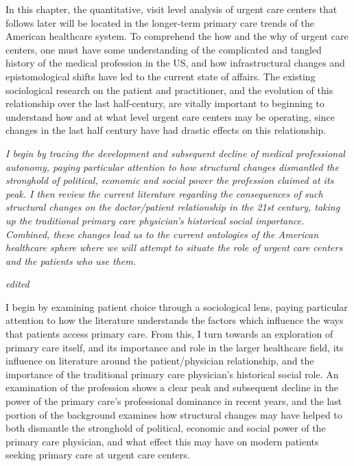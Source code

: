 \documentclass[12pt,twoside]{reedthesis}
\begin{document}
  In this chapter, the quantitative, visit level analysis of urgent care
  centers that follows later will be located in the longer-term primary
  care trends of the American healthcare system. To comprehend the how and
  the why of urgent care centers, one must have some understanding of the
  complicated and tangled history of the medical profession in the US, and
  how infrastructural changes and epistomological shifts have led to the
  current state of affairs. The existing sociological research on the
  patient and practitioner, and the evolution of this relationship over
  the last half-century, are vitally important to beginning to understand
  how and at what level urgent care centers may be operating, since
  changes in the last half century have had drastic effects on this
  relationship.
  
  \emph{I begin by tracing the development and subsequent decline of
  medical professional autonomy, paying particular attention to how
  structural changes dismantled the stronghold of political, economic and
  social power the profession claimed at its peak. I then review the
  current literature regarding the consequences of such structural changes
  on the doctor/patient relationship in the 21st century, taking up the
  traditional primary care physician's historical social importance.
  Combined, these changes lead us to the current ontologies of the
  American healthcare sphere where we will attempt to situate the role of
  urgent care centers and the patients who use them.}
  
  \emph{edited}
  
  I begin by examining patient choice through a sociological lens, paying
  particular attention to how the literature understands the factors which
  influence the ways that patients access primary care. From this, I turn
  towards an exploration of primary care itself, and its importance and
  role in the larger healthcare field, its influence on literature around
  the patient/physician relationship, and the importance of the
  traditional primary care physician's historical social role. An
  examination of the profession shows a clear peak and subsequent decline
  in the power of the primary care's professional dominance in recent
  years, and the last portion of the background examines how structural
  changes may have helped to both dismantle the stronghold of political,
  economic and social power of the primary care physician, and what effect
  this may have on modern patients seeking primary care at urgent care
  centers.
  
\end{document}
